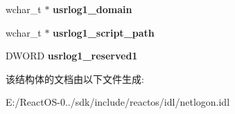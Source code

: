 \begin{DoxyCompactItemize}
wchar\+\_\+t $\ast$ {\bfseries usrlog1\+\_\+domain}
\item 
\mbox{\label{struct___n_e_t_l_o_g_o_n___v_a_l_i_d_a_t_i_o_n___u_a_s___i_n_f_o_a72121f6ec5185230ccf0015a471275f9}} 
wchar\+\_\+t $\ast$ {\bfseries usrlog1\+\_\+script\+\_\+path}
\item 
\mbox{\label{struct___n_e_t_l_o_g_o_n___v_a_l_i_d_a_t_i_o_n___u_a_s___i_n_f_o_af9686b67ecf19c6a8210d52c642d448b}} 
D\+W\+O\+RD {\bfseries usrlog1\+\_\+reserved1}
\end{DoxyCompactItemize}


该结构体的文档由以下文件生成\+:\begin{DoxyCompactItemize}
\item 
E\+:/\+React\+O\+S-\/0../sdk/include/reactos/idl/netlogon.\+idl\end{DoxyCompactItemize}
